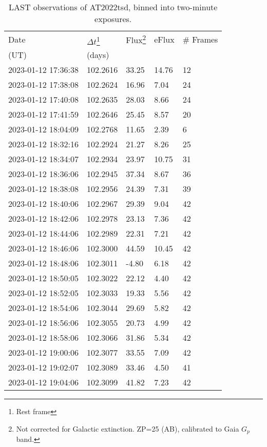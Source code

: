 \documentclass{nature_plusfigure}
\begin{document}
\begin{supplement}
\begin{center} 
\begin{longtable}{lllll} 
\caption{LAST observations of AT2022tsd, binned into two-minute exposures.} 
\label{tab:last-photometry}\\ 
\hline\hline
Date & $\Delta t$\footnote{Rest frame} & Flux\footnote{Not corrected for Galactic extinction. ZP=25 (AB), calibrated to Gaia $G_p$ band.} & eFlux & \# Frames\\ 
(UT) & (days) &  &  & \\ 
\hline
2023-01-12 17:36:38 & 102.2616 & 33.25 & 14.76 & 12 \\ 
2023-01-12 17:38:08 & 102.2624 & 16.96 & 7.04 & 24 \\ 
2023-01-12 17:40:08 & 102.2635 & 28.03 & 8.66 & 24 \\ 
2023-01-12 17:41:59 & 102.2646 & 25.45 & 8.57 & 20 \\ 
2023-01-12 18:04:09 & 102.2768 & 11.65 & 2.39 & 6 \\ 
2023-01-12 18:32:16 & 102.2924 & 21.27 & 8.26 & 25 \\ 
2023-01-12 18:34:07 & 102.2934 & 23.97 & 10.75 & 31 \\ 
2023-01-12 18:36:06 & 102.2945 & 37.34 & 8.67 & 36 \\ 
2023-01-12 18:38:08 & 102.2956 & 24.39 & 7.31 & 39 \\ 
2023-01-12 18:40:06 & 102.2967 & 29.39 & 9.04 & 42 \\ 
2023-01-12 18:42:06 & 102.2978 & 23.13 & 7.36 & 42 \\ 
2023-01-12 18:44:06 & 102.2989 & 22.31 & 7.21 & 42 \\ 
2023-01-12 18:46:06 & 102.3000 & 44.59 & 10.45 & 42 \\ 
2023-01-12 18:48:06 & 102.3011 & -4.80 & 6.18 & 42 \\ 
2023-01-12 18:50:05 & 102.3022 & 22.12 & 4.40 & 42 \\ 
2023-01-12 18:52:05 & 102.3033 & 19.33 & 5.56 & 42 \\ 
2023-01-12 18:54:06 & 102.3044 & 29.69 & 5.82 & 42 \\ 
2023-01-12 18:56:06 & 102.3055 & 20.73 & 4.99 & 42 \\ 
2023-01-12 18:58:06 & 102.3066 & 31.86 & 5.34 & 42 \\ 
2023-01-12 19:00:06 & 102.3077 & 33.55 & 7.09 & 42 \\ 
2023-01-12 19:02:07 & 102.3089 & 33.46 & 4.50 & 41 \\ 
2023-01-12 19:04:06 & 102.3099 & 41.82 & 7.23 & 42 \\ 

\end{longtable}
\end{center}
\end{supplement}
\end{document}
